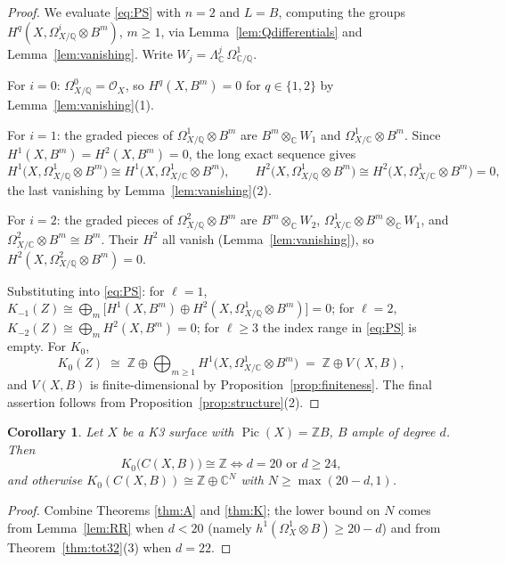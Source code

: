 \documentclass[11pt]{amsart}
\numberwithin{equation}{section}
\theoremstyle{plain}
\newtheorem{corollary}[theorem]{Corollary}
\theoremstyle{definition}
\theoremstyle{remark}
\newcommand{\CC}{\mathbb{C}}
\newcommand{\QQ}{\mathbb{Q}}
\newcommand{\ZZ}{\mathbb{Z}}
\newcommand{\cO}{\mathcal{O}}
\newcommand{\Pic}{\operatorname{Pic}}
\newcommand{\Kzero}{K_0}
\begin{document}
\begin{proof}
We evaluate \eqref{eq:PS} with $n=2$ and $L=B$, computing the groups $H^q(X,\Omega^i_{X/\QQ}\otimes B^m)$, $m\ge1$, via Lemma~\ref{lem:Qdifferentials} and Lemma~\ref{lem:vanishing}.
Write $W_j=\Lambda^j_\CC\,\Omega^1_{\CC/\QQ}$.

For $i=0$: $\Omega^0_{X/\QQ}=\cO_X$, so $H^q(X,B^m)=0$ for $q\in\{1,2\}$ by Lemma~\ref{lem:vanishing}(1).

For $i=1$: the graded pieces of $\Omega^1_{X/\QQ}\otimes B^m$ are $B^m\otimes_\CC W_1$ and $\Omega^1_{X/\CC}\otimes B^m$.
Since $H^1(X,B^m)=H^2(X,B^m)=0$, the long exact sequence gives
\[
H^1\!\big(X,\Omega^1_{X/\QQ}\otimes B^m\big)\cong H^1\!\big(X,\Omega^1_{X/\CC}\otimes B^m\big),
\qquad
H^2\!\big(X,\Omega^1_{X/\QQ}\otimes B^m\big)\cong H^2\!\big(X,\Omega^1_{X/\CC}\otimes B^m\big)=0,
\]
the last vanishing by Lemma~\ref{lem:vanishing}(2).

For $i=2$: the graded pieces of $\Omega^2_{X/\QQ}\otimes B^m$ are $B^m\otimes_\CC W_2$, $\Omega^1_{X/\CC}\otimes B^m\otimes_\CC W_1$, and $\Omega^2_{X/\CC}\otimes B^m\cong B^m$.
Their $H^2$ all vanish (Lemma~\ref{lem:vanishing}), so $H^2(X,\Omega^2_{X/\QQ}\otimes B^m)=0$.

Substituting into \eqref{eq:PS}:
for $\ell=1$, $K_{-1}(Z)\cong\bigoplus_m\big[H^1(X,B^m)\oplus H^2(X,\Omega^1_{X/\QQ}\otimes B^m)\big]=0$;
for $\ell=2$, $K_{-2}(Z)\cong\bigoplus_m H^2(X,B^m)=0$;
for $\ell\ge3$ the index range in \eqref{eq:PS} is empty.
For $\Kzero$,
\[
\Kzero(Z)\;\cong\;\ZZ\oplus\bigoplus_{m\ge1}H^1\!\big(X,\Omega^1_{X/\CC}\otimes B^m\big)\;=\;\ZZ\oplus V(X,B),
\]
and $V(X,B)$ is finite-dimensional by Proposition~\ref{prop:finiteness}.
The final assertion follows from Proposition~\ref{prop:structure}(2).
\end{proof}

\begin{corollary}\label{cor:K}
Let $X$ be a K3 surface with $\Pic(X)=\ZZ B$, $B$ ample of degree $d$. Then
\[
\Kzero\big(C(X,B)\big)\cong\ZZ
\iff d=20 \text{ or } d\ge24,
\]
and otherwise $\Kzero(C(X,B))\cong\ZZ\oplus\CC^N$ with $N\ge\max(20-d,1)$.
\end{corollary}

\begin{proof}
Combine Theorems \ref{thm:A} and \ref{thm:K}; the lower bound on $N$ comes from Lemma~\ref{lem:RR} when $d<20$ (namely $h^1(\Omega^1_X\otimes B)\ge20-d$) and from Theorem~\ref{thm:tot32}(3) when $d=22$.
\end{proof}
\end{document}
